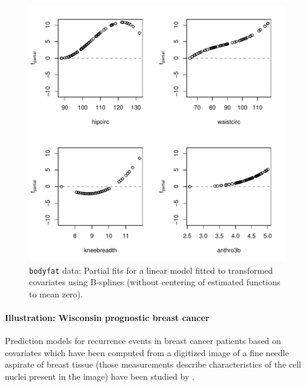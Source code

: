 \documentclass{article}
\newcommand{\Robject}[1]{\texttt{#1}}
\begin{document}
\begin{figure}[t]
\begin{center}
\includegraphics{figures/BH-bodyfat-fpboost-plot}
\caption{\Robject{bodyfat} data: Partial fits for a linear model fitted to
  transformed covariates using B-splines (without centering of estimated
  functions to mean zero). \label{bodyfat-fpboost-plot}}
\end{center}
\end{figure}



\paragraph{Illustration: Wisconsin prognostic breast cancer}


Prediction models for recurrence events in breast cancer patients 
based on covariates which have been computed from a digitized image of a
fine needle aspirate of breast tissue (those measurements describe
characteristics of the cell nuclei present in the image) have been studied
by \citet{street1995} \citep[the data is part of the UCI repository][]{uci1998}.
\end{document}
